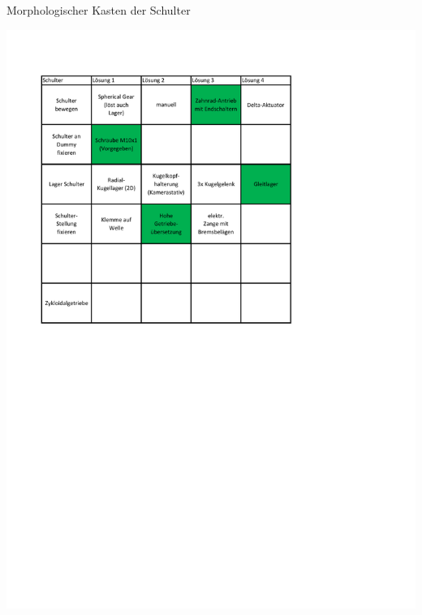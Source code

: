 	\begin{table}[h]
		\caption[Morphologischer Kasten der Schulter]{Morphologischer Kasten der Schulter}
		\centering
		\includegraphics[width=\textwidth]{"Abb/Morphologischer Kasten Schulter"}
		\label{fig:morphologische-kasten-schulter}
	\end{table}

